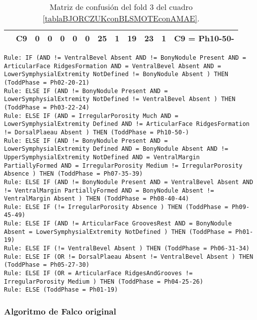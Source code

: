 \begin{table}[H]
{\begin{tabular}{|ccrrrrrrrrrrc|}
\multicolumn{1}{|c|}{}                                      & \multicolumn{1}{c|}{C9} & \multicolumn{1}{c|}{0}  & \multicolumn{1}{c|}{0}  & \multicolumn{1}{c|}{0}  & \multicolumn{1}{c|}{0}  & \multicolumn{1}{c|}{0}  & \multicolumn{1}{c|}{\textbf{25}} & \multicolumn{1}{c|}{\textbf{1}}  & \multicolumn{1}{c|}{\textbf{19}} & \multicolumn{1}{c|}{\textbf{23}} & \multicolumn{1}{c|}{\textbf{1}}  & C9 = Ph10-50-     \\ \hline
\end{tabular}%
}
\caption{Matriz de confusión del fold 3 del cuadro \ref{tablaBJORCZUKconBLSMOTEconAMAE}.}
\end{table}


\begin{lstlisting}
Rule: IF (AND != VentralBevel Absent AND != BonyNodule Present AND = ArticularFace RidgesFormation AND = VentralBevel Absent AND = LowerSymphysialExtremity NotDefined != BonyNodule Absent ) THEN (ToddPhase = Ph02-20-21)
Rule: ELSE IF (AND != BonyNodule Present AND = LowerSymphysialExtremity NotDefined != VentralBevel Absent ) THEN (ToddPhase = Ph03-22-24)
Rule: ELSE IF (AND = IrregularPorosity Much AND = LowerSymphysialExtremity Defined AND != ArticularFace RidgesFormation != DorsalPlaeau Absent ) THEN (ToddPhase = Ph10-50-)
Rule: ELSE IF (AND != BonyNodule Present AND = LowerSymphysialExtremity Defined AND = BonyNodule Absent AND != UpperSymphysialExtremity NotDefined AND = VentralMargin PartiallyFormed AND = IrregularPorosity Medium != IrregularPorosity Absence ) THEN (ToddPhase = Ph07-35-39)
Rule: ELSE IF (AND != BonyNodule Present AND = VentralBevel Absent AND != VentralMargin PartiallyFormed AND = BonyNodule Absent != VentralMargin Absent ) THEN (ToddPhase = Ph08-40-44)
Rule: ELSE IF (!= IrregularPorosity Absence ) THEN (ToddPhase = Ph09-45-49)
Rule: ELSE IF (AND != ArticularFace GroovesRest AND = BonyNodule Absent = LowerSymphysialExtremity NotDefined ) THEN (ToddPhase = Ph01-19)
Rule: ELSE IF (!= VentralBevel Absent ) THEN (ToddPhase = Ph06-31-34)
Rule: ELSE IF (OR != DorsalPlaeau Absent != VentralBevel Absent ) THEN (ToddPhase = Ph05-27-30)
Rule: ELSE IF (OR = ArticularFace RidgesAndGrooves != IrregularPorosity Medium ) THEN (ToddPhase = Ph04-25-26)
Rule: ELSE (ToddPhase = Ph01-19)
\end{lstlisting}

\subsubsection{Algoritmo de Falco original}


